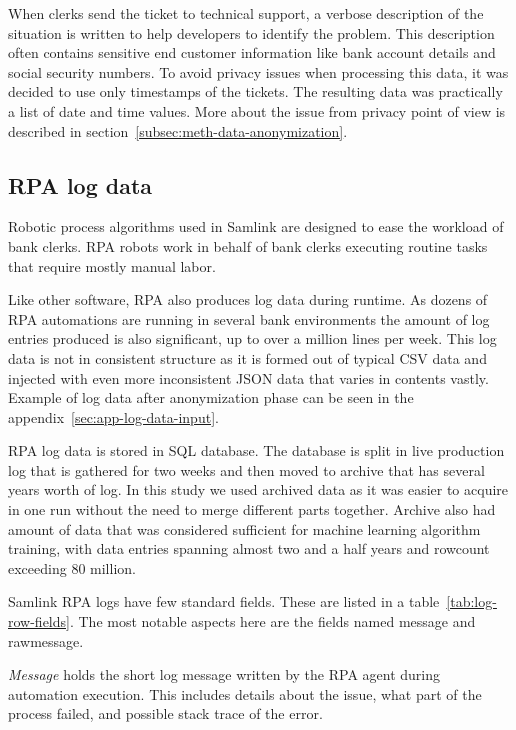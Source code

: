 When clerks send the ticket to technical support,
a verbose description of the situation is written
to help developers to identify the problem.
This description often contains sensitive end customer information
like bank account details and social security numbers.
To avoid privacy issues when processing this data,
it was decided to use only timestamps of the tickets.
The resulting data was practically a list of date and time values.
More about the issue from privacy point of view
is described in section~\ref{subsec:meth-data-anonymization}.


\subsection{RPA log data}\label{subsec:meth-rpa-log-data}
Robotic process algorithms used in Samlink
are designed to ease the workload of bank clerks.
RPA robots work in behalf of bank clerks
executing routine tasks that require mostly manual labor.

Like other software,
RPA also produces log data during runtime.
As dozens of RPA automations are running
in several bank environments
the amount of log entries produced is also significant,
up to over a million lines per week.
This log data is not in consistent structure
as it is formed out of typical CSV data
and injected with even more inconsistent JSON data
that varies in contents vastly.
Example of log data after anonymization phase
can be seen in the appendix~\ref{sec:app-log-data-input}.

RPA log data is stored in SQL database.
The database is split in live production log
that is gathered for two weeks
and then moved to archive
that has several years worth of log.
In this study we used archived data
as it was easier to acquire in one run
without the need to merge different parts together.
Archive also had amount of data
that was considered sufficient
for machine learning algorithm training,
with data entries spanning almost two and a half years
and rowcount exceeding 80 million.

Samlink RPA logs have few standard fields.
These are listed in a table~\ref{tab:log-row-fields}.
The most notable aspects here
are the fields named message and rawmessage.

\textit{Message} holds the short log message
written by the RPA agent during automation execution.
This includes details about the issue,
what part of the process failed,
and possible stack trace of the error.

